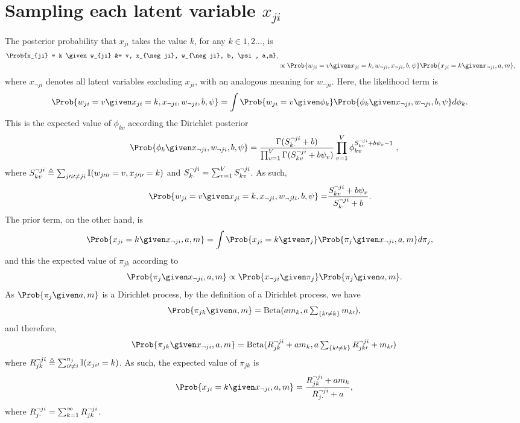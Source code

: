 \section{Sampling each latent variable $x_{ji}$}

The posterior probability that $x_{ji}$ takes the value $k$, for any $k \in 1, 2 \ldots $, is
\[
	\begin{split}
		\Prob{x_{ji} = k \given w_{ji} &= v, x_{\neg ji}, w_{\neg ji}, b, \psi, a,m},\\
		&\propto
	\Prob{w_{ji} =v \given x_{ji}=k, w_{\neg ji}, x_{\neg ji}, b, \psi}
	\Prob{x_{ji} =k \given x_{\neg ji}, a,m},
	\end{split}
\]
where $x_{\neg ji}$ denotes all latent variables excluding $x_{ji}$, with an analogous
meaning for $w_{\neg ji}$. 
Here, the likelihood term is
\begin{align*}
\Prob{w_{ji}=v \given x_{ji}=k, x_{\neg ji}, w_{\neg ji},b, \psi} 
	&= \int \Prob{w_{ji}=v \given \phisub{\phi}{k}} 
	\Prob{\phisub{\phi}{k} \given x_{\neg ji}, w_{\neg ji},b, \psi} d\phisub{\phi}{k}.
\end{align*}
This is the expected value of $\phi_{kv}$ according the Dirichlet posterior
\[
\Prob{\phi_k \given x_{\neg ji} , w_{\neg ji}, b, \psi} 
= \frac{\Gamma(\rji{S}{k\cdot}{ji}+b)}{\prod_{v=1}^V\Gamma(\rji{S}{kv}{ji}+b\psi_v)} 
  \prod_{v=1}^V\phi_{kv}^{\rji{S}{kv}{ji} + b\psi_v - 1}\ ,
\]
where $\rji{S}{kv}{ji} \triangleq \sum_{j\prime i\prime \neq ji}
\mathbb{I}(w_{j\prime i\prime}=v,x_{j\prime i\prime }=k)$ and $\rji{S}{k\cdot}{ji} =
\sum_{v=1}^V \rji{S}{kv}{ji}$. 
As such,
\begin{align*}
\Prob{w_{ji}=v \given x_{ji}=k, x_{\neg ji}, w_{\neg jli},b, \psi} 
	= &\frac{\rji{S}{kv}{ji} + b\psi_{v}}{\rji{S}{k\cdot}{ji} + b}.
\end{align*}
The prior term, on the other hand, is
\begin{align*}
\Prob{x_{ji}=k \given x_{\neg ji},a,m} 
	&= \int \Prob{x_{ji}=k \given \phisub{\pi}{j}} 
	\Prob{\phisub{\pi}{j} \given x_{\neg ji}, a,m} d\phisub{\pi}{j},
\end{align*}
and this the expected value of $\pi_{jk}$ according to
\[
\Prob{\phisub{\pi}{j} \given x_{\neg ji}, a,m} \propto \Prob{x_{\neg ji} \given \pi_j}\Prob{\pi_j \given a, m}.
\]
As $\Prob{\pi_j \given a, m}$ is a Dirichlet
process, by the definition of a Dirichlet process, we have
\[
	\Prob{\pi_{jk} \given a, m} = \mathrm{Beta}(am_k, a\textstyle\sum_{\{k\prime \neq k\}}m_{k\prime}),
\]
and therefore,
\[
	\Prob{\pi_{jk} \given x_{\neg ji}, a, m} 
	= \mathrm{Beta}(\rji{R}{jk}{ji} + am_k , 
			a\textstyle\sum_{\{k\prime \neq k\}}
			\rji{R}{jk\prime}{ji}+m_{k\prime})
\]
where
$\rji{R}{jk}{ji} \triangleq \sum_{i\prime \neq i}^{n_j}\mathbb{I}(x_{ji\prime }=k)$. 
As such, the expected value of $\pi_{jk}$ is
\[
\Prob{x_{ji}=k \given x_{\neg ji},a,m} 
	= \frac{\rji{R}{jk}{ji} + am_{k}}{\rji{R}{j\cdot}{ji} + a},
\]
where
$\rji{R}{j\cdot}{ji} = \sum_{k=1}^\infty \rji{R}{jk}{ji}$.

